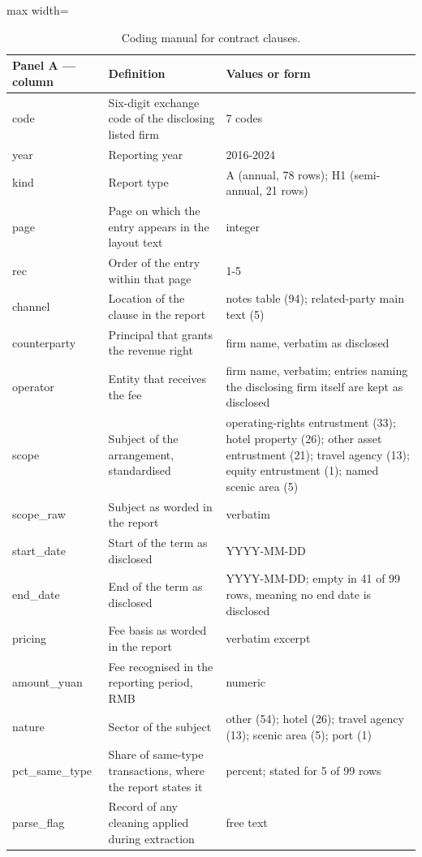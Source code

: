\documentclass[review,3p,times]{elsarticle}
\begin{document}
\begin{table}[!htbp]
\centering
\renewcommand{\thetable}{A3}
\caption{Coding manual for contract clauses.}\label{tab:A3}
\begin{minipage}{\textwidth}
\centering
\footnotesize
\begin{adjustbox}{max width=\textwidth}
\begin{tabular}{@{}lll@{}}
\toprule
Panel A --- column & Definition & Values or form \\
\midrule
code & Six-digit exchange code of the disclosing listed firm & 7 codes \\
year & Reporting year & 2016-2024 \\
kind & Report type & A (annual, 78 rows); H1 (semi-annual, 21 rows) \\
page & Page on which the entry appears in the layout text & integer \\
rec & Order of the entry within that page & 1-5 \\
channel & Location of the clause in the report & notes table (94); related-party main text (5) \\
counterparty & Principal that grants the revenue right & firm name, verbatim as disclosed \\
operator & Entity that receives the fee & firm name, verbatim; entries naming the disclosing firm itself are kept as disclosed \\
scope & Subject of the arrangement, standardised & operating-rights entrustment (33); hotel property (26); other asset entrustment (21); travel agency (13); equity entrustment (1); named scenic area (5) \\
scope\_raw & Subject as worded in the report & verbatim \\
start\_date & Start of the term as disclosed & YYYY-MM-DD \\
end\_date & End of the term as disclosed & YYYY-MM-DD; empty in 41 of 99 rows, meaning no end date is disclosed \\
pricing & Fee basis as worded in the report & verbatim excerpt \\
amount\_yuan & Fee recognised in the reporting period, RMB & numeric \\
nature & Sector of the subject & other (54); hotel (26); travel agency (13); scenic area (5); port (1) \\
pct\_same\_type & Share of same-type transactions, where the report states it & percent; stated for 5 of 99 rows \\
parse\_flag & Record of any cleaning applied during extraction & free text \\

\end{tabular}
\end{adjustbox}
\end{minipage}
\end{table}
\end{document}
